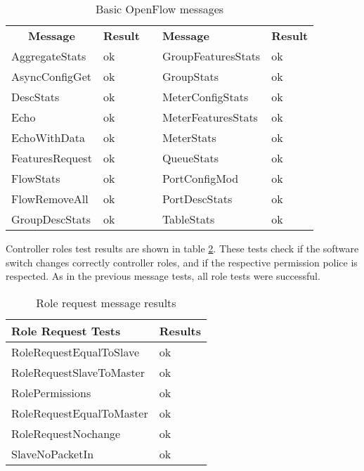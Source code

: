 \begin{table}[h]
\centering
\caption{Basic OpenFlow messages}
\label{tab:oftestbasic}
\begin{tabular}{|l|l|l|l|l|}
\cline{1-2} \cline{4-5}
\multicolumn{1}{|c|}{\textbf{Message}} & \textbf{Result} &  & \textbf{Message}   & \textbf{Result} \\ \cline{1-2} \cline{4-5} 
AggregateStats                         & ok              &  & GroupFeaturesStats & ok              \\ \cline{1-2} \cline{4-5} 
AsyncConfigGet                         & ok              &  & GroupStats         & ok              \\ \cline{1-2} \cline{4-5} 
DescStats                              & ok              &  & MeterConfigStats   & ok              \\ \cline{1-2} \cline{4-5} 
Echo                                   & ok              &  & MeterFeaturesStats & ok              \\ \cline{1-2} \cline{4-5} 
EchoWithData                           & ok              &  & MeterStats         & ok              \\ \cline{1-2} \cline{4-5} 
FeaturesRequest                        & ok              &  & QueueStats         & ok              \\ \cline{1-2} \cline{4-5} 
FlowStats                              & ok              &  & PortConfigMod      & ok              \\ \cline{1-2} \cline{4-5} 
FlowRemoveAll                          & ok              &  & PortDescStats      & ok              \\ \cline{1-2} \cline{4-5} 
GroupDescStats                         & ok              &  & TableStats         & ok              \\ \cline{1-2} \cline{4-5} 
\end{tabular}
\end{table}

Controller roles test results are shown in table \ref{tab:oftestrole}. These tests check if the software switch changes correctly controller roles, and if the respective permission police is respected. As in the previous message tests, all role tests were successful.    

\begin{table}[h]
\centering
\caption{Role request message results}
\label{tab:oftestrole}
\begin{tabular}{|l|l|}
\hline
\textbf{Role Request Tests} & \textbf{Results} \\ \hline
RoleRequestEqualToSlave     & ok               \\ \hline
RoleRequestSlaveToMaster    & ok               \\ \hline
RolePermissions             & ok               \\ \hline
RoleRequestEqualToMaster    & ok               \\ \hline
RoleRequestNochange         & ok               \\ \hline
SlaveNoPacketIn             & ok               \\ \hline
\end{tabular}
\end{table}

